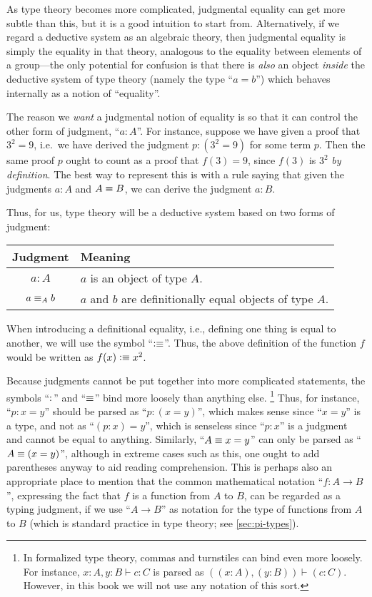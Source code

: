As type theory becomes more complicated, judgmental equality can get more subtle than this, but it is a good intuition to start from.
Alternatively, if we regard a deductive system as an algebraic theory, then judgmental equality is simply the equality in that theory, analogous to the equality between elements of a group---the only potential for confusion is that there is \emph{also} an object \emph{inside} the deductive system of type theory (namely the type ``$a=b$'') which behaves internally as a notion of ``equality''.

The reason we \emph{want} a judgmental notion of equality is so that it can control the other form of judgment, ``$a:A$''.
For instance, suppose we have given a proof that $3^2=9$, i.e.\ we have derived the judgment $p:(3^2=9)$ for some term $p$.
Then the same proof $p$ ought to count as a proof that $f(3)=9$, since $f(3)$ is $3^2$ \emph{by definition}.
The best way to represent this is with a rule saying that given the judgments $a:A$ and $A\equiv B$, we can derive the judgment $a:B$.

Thus, for us, type theory will be a deductive system based on two forms of judgment:
\begin{center}
\begin{tabular}{c|l}
  \textbf{Judgment} & \textbf{Meaning}\\\hline
  $a : A$ & $a$ is an object of type $A$.\\
  $a \equiv_A b$ & $a$ and $b$ are definitionally equal objects of type $A$.
\end{tabular}
\end{center}
When introducing a definitional equality, i.e., defining one thing is equal to another, we will use the symbol ``$\vcentcolon\equiv$''.
Thus, the above definition of the function $f$ would be written as $f(x)\vcentcolon\equiv x^2$.

Because judgments cannot be put together into more complicated statements, the symbols ``$:$'' and ``$\equiv$'' bind more loosely than anything else.
\footnote{In formalized type theory, commas and turnstiles can bind even more loosely.
  For instance, $x:A,y:B\vdash c:C$ is parsed as $((x:A),(y:B))\vdash (c:C)$.
  However, in this book we will not use any notation of this sort.}\nopagebreak
Thus, for instance, ``$p:x=y$'' should be parsed as ``$p:(x=y)$'', which makes sense since ``$x=y$'' is a type, and not as ``$(p:x)=y$'', which is senseless since ``$p:x$'' is a judgment and cannot be equal to anything.
Similarly, ``$A\equiv x=y$'' can only be parsed as ``$A\equiv(x=y)$'', although in extreme cases such as this, one ought to add parentheses anyway to aid reading comprehension.
This is perhaps also an appropriate place to mention that the common mathematical notation ``$f:A\to B$'', expressing the fact that $f$ is a function from $A$ to $B$, can be regarded as a typing judgment, if we use ``$A\to B$'' as notation for the type of functions from $A$ to $B$ (which is standard practice in type theory; see \autoref{sec:pi-types}).

